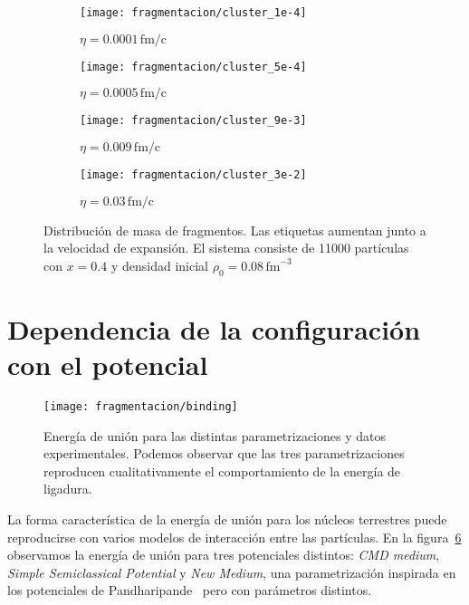 \begin{figure} \centering
  \begin{subfigure}[h!]{0.45\columnwidth}
    \texttt{[image: fragmentacion/cluster\_1e-4]}
    \caption{$\eta = 0.0001\,\text{fm/c}$}
    \label{subfig:1e-4}
  \end{subfigure}
  \begin{subfigure}[h!]{0.45\columnwidth}
    \texttt{[image: fragmentacion/cluster\_5e-4]}
    \caption{$\eta = 0.0005\,\text{fm/c}$}
    \label{subfig:5e-4}
  \end{subfigure}
  \begin{subfigure}[h!]{0.45\columnwidth}
    \texttt{[image: fragmentacion/cluster\_9e-3]}
    \caption{$\eta = 0.009\,\text{fm/c}$}
    \label{subfig:9e-3}
  \end{subfigure}
  \begin{subfigure}[h!]{0.45\columnwidth}
    \texttt{[image: fragmentacion/cluster\_3e-2]}
    \caption{$\eta = 0.03\,\text{fm/c}$}
    \label{subfig:3e-2}
  \end{subfigure}
  \caption{Distribución de masa de fragmentos.
    Las etiquetas aumentan junto a la velocidad de expansión.
    El sistema consiste de 11000 partículas con $x=0.4$ y densidad inicial $\rho_0 = 0.08\,\text{fm}^{-3}$}
  \label{fig:distribution}
\end{figure}

\section{Dependencia de la configuración con el potencial}

\begin{figure} \centering
  \texttt{[image: fragmentacion/binding]}
  \caption{Energía de unión para las distintas parametrizaciones y datos experimentales.
    Podemos observar que las tres parametrizaciones reproducen cualitativamente el comportamiento de la energía de ligadura.}
  \label{fig:binding}
\end{figure}
La forma característica de la energía de unión para los núcleos terrestres puede reproducirse con varios modelos de interacción entre las partículas.
En la figura~\ref{fig:binding} observamos la energía de unión para tres potenciales distintos: \emph{CMD medium}, \emph{Simple Semiclassical Potential} y \emph{New Medium}, una parametrización inspirada en los potenciales de Pandharipande~\cite{akmal_equation_1998} pero con parámetros distintos.

